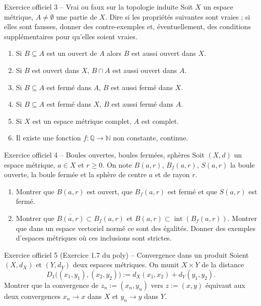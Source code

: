 \documentclass[11pt,a4paper]{article}
\newcommand{\N}{\mathbb{N}}
\newcommand{\Q}{\mathbb{Q}}
\newcommand{\adh}[1]{\overline{#1}}
\newcommand{\Int}{\operatorname{int}}
\newcommand{\Bf}{B_f}
\theoremstyle{definition}
\begin{document}
\begin{exo}{Exercice officiel 3 -- Vrai ou faux sur la topologie induite}
Soit $X$ un espace métrique, $A\neq\emptyset$ une partie de $X$. Dire si les propriétés suivantes sont vraies ; si elles sont fausses, donner des contre-exemples et, éventuellement, des conditions supplémentaires pour qu'elles soient vraies.
\begin{enumerate}[label=\arabic*.]
  \item Si $B\subseteq A$ est un ouvert de $A$ alors $B$ est aussi ouvert dans $X$.
  \item Si $B$ est ouvert dans $X$, $B\cap A$ est aussi ouvert dans $A$.
  \item Si $B\subseteq A$ est fermé dans $A$, $B$ est aussi fermé dans $X$.
  \item Si $B\subseteq A$ est fermé dans $X$, $B$ est aussi fermé dans $A$.
  \item Si $X$ est un espace métrique complet, $A$ est complet.
  \item Il existe une fonction $f:\Q\to\N$ non constante, continue.
\end{enumerate}
\end{exo}

\begin{exo}{Exercice officiel 4 -- Boules ouvertes, boules fermées, sphères}
Soit $(X,d)$ un espace métrique, $a\in X$ et $r\ge0$. On note $B(a,r)$, $\Bf(a,r)$, $S(a,r)$ la boule ouverte, la boule fermée et la sphère de centre $a$ et de rayon $r$.
\begin{enumerate}[label=\alph*)]
  \item Montrer que $B(a,r)$ est ouvert, que $\Bf(a,r)$ est fermé et que $S(a,r)$ est fermé.
  \item Montrer que $\adh{B(a,r)}\subset\Bf(a,r)$ et $B(a,r)\subset\Int(\Bf(a,r))$. Montrer que dans un espace vectoriel normé ce sont des égalités. Donner des exemples d'espaces métriques où ces inclusions sont strictes.
\end{enumerate}
\end{exo}

\begin{exo}{Exercice officiel 5 (Exercice 1.7 du poly) -- Convergence dans un produit}
Soient $(X,d_X)$ et $(Y,d_Y)$ deux espaces métriques. On munit $X\times Y$ de la distance
\[
D_1\big((x_1,y_1),(x_2,y_2)\big):=d_X(x_1,x_2)+d_Y(y_1,y_2).
\]
Montrer que la convergence de $z_n:=(x_n,y_n)$ vers $z:=(x,y)$ équivaut aux deux convergences $x_n\to x$ dans $X$ et $y_n\to y$ dans $Y$.
\end{exo}
\end{document}
